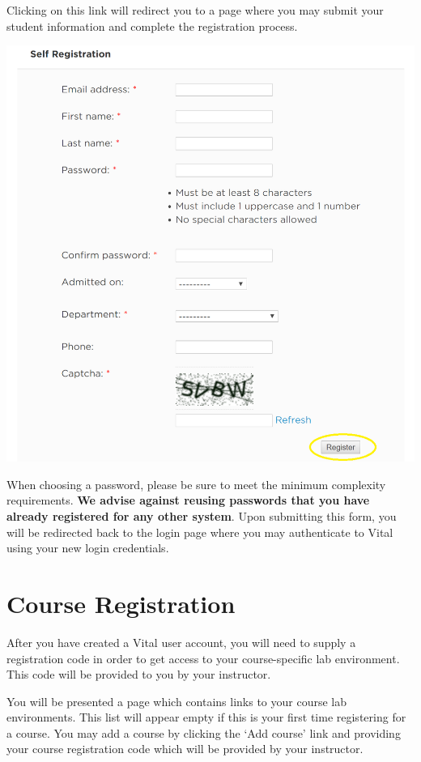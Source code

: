 \documentclass[12pt]{article}
\begin{document}
Clicking on this link will redirect you to a page where you may submit your student information and complete the registration process. 

{%
\centering
\includegraphics[scale=0.50]{self_registration.png}

}

When choosing a password, please be sure to meet the minimum complexity requirements. \textbf{We advise against reusing passwords that you have already registered for any other system}. Upon submitting this form, you will be redirected back to the login page where you may authenticate to Vital using your new login credentials.

\section*{Course Registration}
After you have created a Vital user account, you will need to supply a registration code in order to get access to your course-specific lab environment. This code will be provided to you by your instructor.

You will be presented a page which contains links to your course lab environments. This list will appear empty if this is your first time registering for a course. You may add a course by clicking the `Add course' link and providing your course registration code which will be provided by your instructor.
\end{document}
